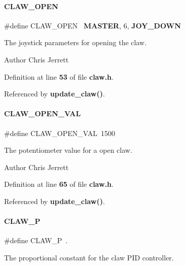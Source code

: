 \paragraph{C\+L\+A\+W\+\_\+\+O\+P\+EN}
{\footnotesize\ttfamily \#define C\+L\+A\+W\+\_\+\+O\+P\+EN~\textbf{ M\+A\+S\+T\+ER}, 6, \textbf{ J\+O\+Y\+\_\+\+D\+O\+WN}}



The joystick parameters for opening the claw. 

\begin{DoxyAuthor}{Author}
Chris Jerrett 
\end{DoxyAuthor}


Definition at line \textbf{ 53} of file \textbf{ claw.\+h}.



Referenced by \textbf{ update\+\_\+claw()}.

\mbox{\label{claw_8h_a519372d8dfa1706d706053ab035ea0b9}} 
\paragraph{C\+L\+A\+W\+\_\+\+O\+P\+E\+N\+\_\+\+V\+AL}
{\footnotesize\ttfamily \#define C\+L\+A\+W\+\_\+\+O\+P\+E\+N\+\_\+\+V\+AL~1500}



The potentiometer value for a open claw. 

\begin{DoxyAuthor}{Author}
Chris Jerrett 
\end{DoxyAuthor}


Definition at line \textbf{ 65} of file \textbf{ claw.\+h}.



Referenced by \textbf{ update\+\_\+claw()}.

\mbox{\label{claw_8h_a1f95cce21c67a6f43850ab9660c2d68a}} 
\paragraph{C\+L\+A\+W\+\_\+P}
{\footnotesize\ttfamily \#define C\+L\+A\+W\+\_\+P~.}



The proportional constant for the claw P\+ID controller. 

